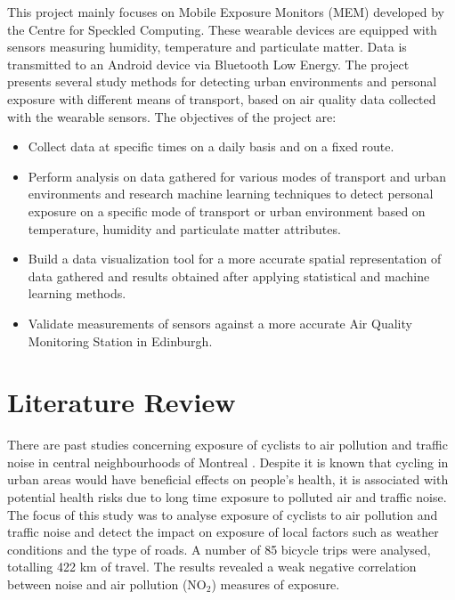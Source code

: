 \documentclass[bsc,frontabs,twoside,singlespacing,parskip,deptreport]{infthesis}     %
\begin{document}
This project mainly focuses on Mobile Exposure Monitors (MEM) developed by the Centre for Speckled Computing. These wearable devices are equipped with sensors measuring humidity, temperature and particulate matter. Data is transmitted to an Android device via Bluetooth Low Energy. The project presents several study methods for detecting urban environments and personal exposure with different means of transport, based on air quality data collected with the wearable sensors. The objectives of the project are:

\begin{itemize}
\item Collect data at specific times on a daily basis and on a fixed route.
\item Perform analysis on data gathered for various modes of transport and urban environments and research machine learning techniques to detect personal exposure on a specific mode of transport or urban environment based on temperature, humidity and particulate matter attributes.
\item Build a data visualization tool for a more accurate spatial representation of data gathered and results obtained after applying statistical and machine learning methods.
\item Validate measurements of sensors against a more accurate Air Quality Monitoring Station in Edinburgh.
\end{itemize}

\section{Literature Review}

There are past studies concerning exposure of cyclists to air pollution and traffic noise in central neighbourhoods of Montreal \cite{Apparicio201663}. Despite it is known that cycling in urban areas would have beneficial effects on people's health, it is associated with potential health risks due to long time exposure to polluted air and traffic noise. The focus of this study was to analyse exposure of cyclists to air pollution and traffic noise and detect the impact on exposure of local factors such as weather conditions and the type of roads. A number of 85 bicycle trips were analysed, totalling 422 km of travel. The results revealed a weak negative correlation between noise and air pollution (NO$_2$) measures of exposure.
\end{document}
